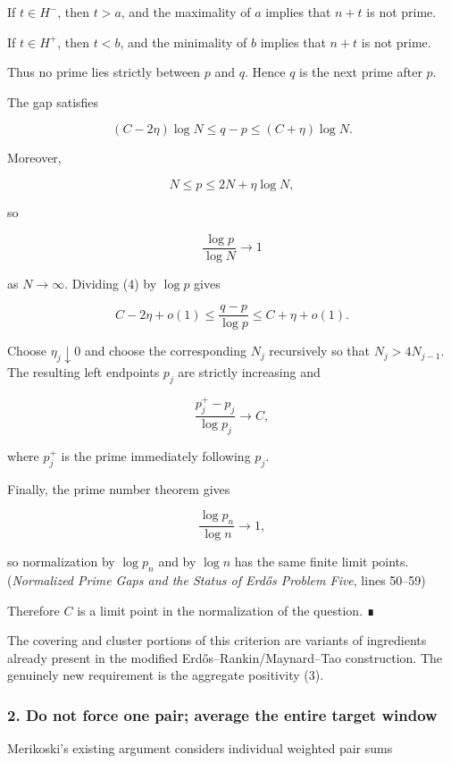 If \(t\in H^-\), then \(t>a\), and the maximality of \(a\) implies that \(n+t\) is not prime.

If \(t\in H^+\), then \(t<b\), and the minimality of \(b\) implies that \(n+t\) is not prime.

Thus no prime lies strictly between \(p\) and \(q\). Hence \(q\) is the next prime after \(p\).

The gap satisfies

\[
(C-2\eta)\log N
\le q-p
\le(C+\eta)\log N.
\tag{4}
\]

Moreover,

\[
N\le p\le2N+\eta\log N,
\]

so

\[
\frac{\log p}{\log N}\longrightarrow1
\]

as \(N\to\infty\). Dividing (4) by \(\log p\) gives

\[
C-2\eta+o(1)
\le
\frac{q-p}{\log p}
\le
C+\eta+o(1).
\]

Choose \(\eta_j\downarrow0\) and choose the corresponding \(N_j\) recursively so that \(N_j>4N_{j-1}\). The resulting left endpoints \(p_j\) are strictly increasing and

\[
\frac{p_j^+-p_j}{\log p_j}\longrightarrow C,
\]

where \(p_j^+\) is the prime immediately following \(p_j\).

Finally, the prime number theorem gives

\[
\frac{\log p_n}{\log n}\longrightarrow1,
\]

so normalization by \(\log p_n\) and by \(\log n\) has the same finite limit points. (\textit{Normalized Prime Gaps and the Status of Erd\H{o}s Problem Five}, lines 50--59)

Therefore \(C\) is a limit point in the normalization of the question. ∎

The covering and cluster portions of this criterion are variants of ingredients already present in the modified Erdős–Rankin/Maynard–Tao construction. The genuinely new requirement is the aggregate positivity (3).

\medskip
\medskip


\subsubsection*{2. Do not force one pair; average the entire target window}

Merikoski’s existing argument considers individual weighted pair sums

